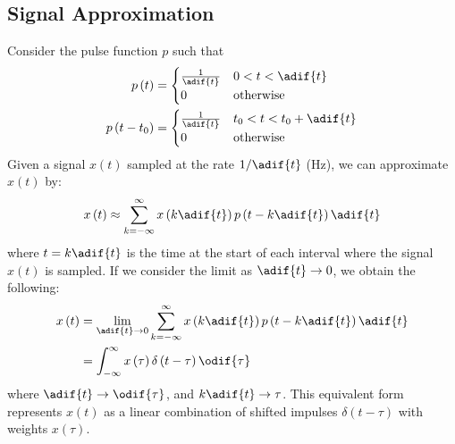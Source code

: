 \documentclass{article}
\begin{document}
\subsection{Signal Approximation}
Consider the pulse function \(p\) such that
\begin{align*}
    p\left( t \right)       & =
                                \begin{cases}
                                    \frac{1}{\adif{t}} & 0 < t < \adif{t} \\
                                    0                  & \text{otherwise}
                                \end{cases}
    \\
    p\left( t - t_0 \right) & =
                                \begin{cases}
                                    \frac{1}{\adif{t}} & t_0 < t < t_0 + \adif{t} \\
                                    0                  & \text{otherwise}
                                \end{cases}
\end{align*}
Given a signal \(x\left( t \right)\) sampled at the rate \(1/\adif{t}\) (\unit{Hz}),
we can approximate \(x\left( t \right)\) by:
\begin{equation*}
    x\left( t \right) \approx \sum_{k = -\infty}^\infty x\left( k \adif{t} \right) p\left( t - k \adif{t} \right) \adif{t}
\end{equation*}
where \(t = k \adif{t}\) is the time at the start of each interval where the signal \(x\left( t \right)\) is sampled.
If we consider the limit as \(\adif{t} \to 0\), we obtain the following:
\begin{align*}
    x\left( t \right) & = \lim_{\adif{t} \to 0} \sum_{k = -\infty}^\infty x\left( k \adif{t} \right) p\left( t - k \adif{t} \right) \adif{t} \\
                      & = \int_{-\infty}^\infty x\left( \tau \right) \delta\left( t - \tau \right) \odif{\tau}
\end{align*}
where \(\adif{t} \to \odif{\tau}\), and \(k \adif{t} \to \tau\).
This equivalent form represents \(x\left( t \right)\) as a linear combination of shifted impulses \(\delta\left( t - \tau \right)\)
with weights \(x\left( \tau \right)\).
\end{document}
